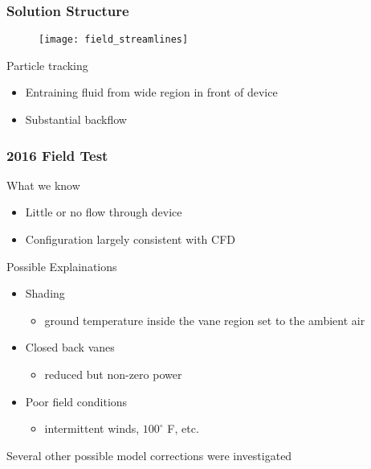 \documentclass[mathserif]{beamer}
\begin{document}
%
%
%
\begin{frame}
 \frametitle{Solution Structure}


\begin{figure}[!htb]
  \centering
  \texttt{[image: field\_streamlines]}
 \end{figure}

\begin{block}{Particle tracking}
 \begin{itemize}
  \item Entraining fluid from wide region in front of device
  \item Substantial backflow
\end{itemize}
\end{block}

\end{frame}


%
%
%
\begin{frame}
 \frametitle{2016 Field Test}

\begin{block}{What we know}
\begin{itemize}
 \item Little or no flow through device
 \item Configuration largely consistent with CFD
\end{itemize}
\end{block}

\begin{block}{Possible Explainations}
\begin{itemize}
 \item Shading
       \begin{itemize}
	\item ground temperature inside the vane region set to the ambient air 
       \end{itemize}
 \item Closed back vanes
       \begin{itemize}
	\item reduced but non-zero power
       \end{itemize}
 \item Poor field conditions
       \begin{itemize}
	\item intermittent winds, $100^{\circ}$ F, etc. 
       \end{itemize}
\end{itemize}
\end{block}

\bigbreak
\centering 
Several other possible model corrections were investigated

\end{frame}
\end{document}
